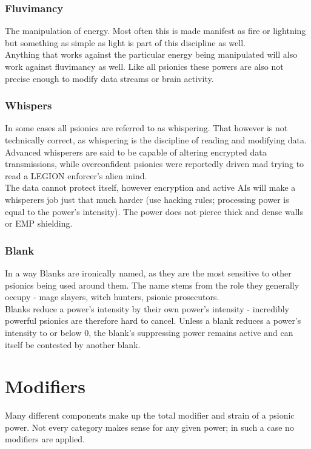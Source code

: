 \documentclass[12pt,a4paper,openany]{book}
\begin{document}
	\subsubsection*{Fluvimancy}
	The manipulation of energy. Most often this is made manifest as fire or lightning but something as simple as light is part of this discipline as well.\\
	Anything that works against the particular energy being manipulated will also work against fluvimancy as well. Like all psionics these powers are also not precise enough to modify data streams or brain activity.
	\subsubsection*{Whispers}
	In some cases all psionics are referred to as whispering. That however is not technically correct, as whispering is the discipline of reading and modifying data. Advanced whisperers are said to be capable of altering encrypted data transmissions, while overconfident psionics were reportedly driven mad trying to read a LEGION enforcer's alien mind.\\
	The data cannot protect itself, however encryption and active AIs will make a whisperers job just that much harder (use hacking rules; processing power is equal to the power's intensity). The power does not pierce thick and dense walls or EMP shielding.
	\subsubsection*{Blank}
	In a way Blanks are ironically named, as they are the most sensitive to other psionics being used around them. The name stems from the role they generally occupy - mage slayers, witch hunters, psionic prosecutors.\\
	Blanks reduce a power's intensity by their own power's intensity - incredibly powerful psionics are therefore hard to cancel. Unless a blank reduces a power's intensity to or below 0, the blank's suppressing power remains active and can itself be contested by another blank.
	\section{Modifiers}
	Many different components make up the total modifier and strain of a psionic power. Not every category makes sense for any given power; in such a case no modifiers are applied.
\end{document}
